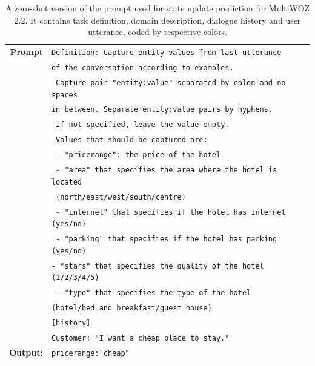 \begin{table}[tp]
    \centering\small
    \begin{tabular}{rl}
      \toprule
      \textbf{Prompt} & \texttt{{\color{cyan!80!yellow!80!black!100 }Definition: Capture entity values from last utterance}}\\
      & \texttt{{\color{cyan!80!yellow!80!black!100 }of the conversation according to examples.}} \\
    & \texttt{{\color{cyan!80!yellow!80!black!100 } Capture pair "entity:value" separated by colon and no spaces}}\\ 
    & \texttt{{\color{cyan!80!yellow!80!black!100 }in between. Separate entity:value pairs by hyphens.}} \\
      & \texttt{{\color{cyan!80!yellow!80!black!100!} If not specified, leave the value empty.}}\\ 
      & \texttt{{\color{cyan!80!yellow!80!black!100!} Values that should be captured are: }} \\
      & \texttt{{\color{green!100!yellow!70!black!100!} - "pricerange": the price of the hotel} }\\
      & \texttt{{\color{green!100!yellow!70!black!100!} - "area" that specifies the area where the hotel is located}} \\
      & \texttt{{\color{green!100!yellow!70!black!100!}
      (north/east/west/south/centre)}} \\
      & \texttt{{\color{green!100!yellow!70!black!100!} - "internet" that specifies if the hotel has internet (yes/no)}} \\
      & \texttt{{\color{green!100!yellow!70!black!100!} - "parking" that specifies if the hotel has parking (yes/no)}} \\
      & \texttt{{\color{green!100!yellow!70!black!100!}- "stars" that specifies the quality of the hotel (1/2/3/4/5)}} \\
      & \texttt{{\color{green!100!yellow!70!black!100!} - "type" that specifies the type of the hotel}}\\
      & \texttt{{\color{green!100!yellow!70!black!100!}(hotel/bed and breakfast/guest house)}} \\
      & \texttt{{\color{red!100!yellow!70!black!100!}[history] }} \\
      &  \texttt{{\color{orange!50!yellow!90!black!100!}Customer: "I want a cheap place to stay." }}\\
      \midrule
      \textbf{Output:} & \texttt{pricerange:"cheap"}\\
      \bottomrule
  \end{tabular}
  \caption{A zero-shot version of the prompt used for state update prediction for MultiWOZ 2.2.
  It contains {\color{cyan!80!yellow!80!black!100} task definition},  {\color{green!100!yellow!70!black!100!}domain description}, {\color{red!100!yellow!70!black!100!} dialogue history} and {\color{orange!50!yellow!90!black!100!} user utterance}, coded by respective colors.}
  \label{07_tab:zero-shot-state}
\end{table}

